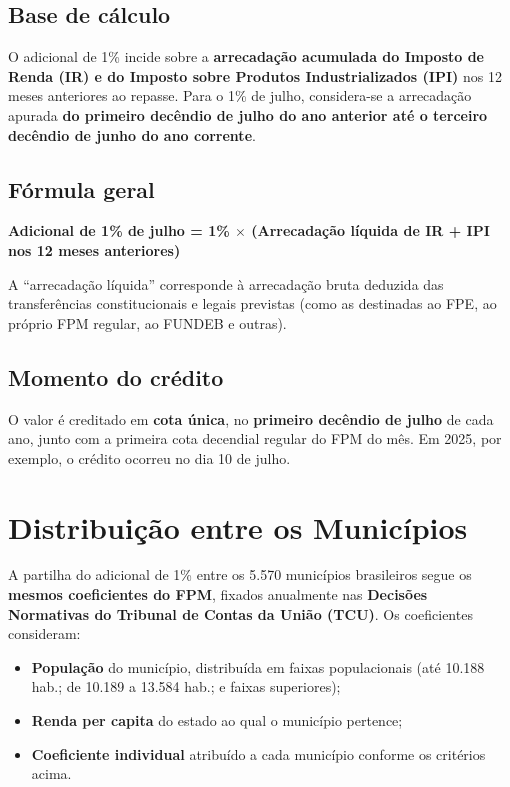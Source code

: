 \documentclass[12pt,a4paper]{article}
\begin{document}
\subsection{Base de cálculo}

O adicional de 1\% incide sobre a \textbf{arrecadação acumulada do Imposto de Renda (IR) e do Imposto sobre Produtos Industrializados (IPI)} nos 12 meses anteriores ao repasse. Para o 1\% de julho, considera-se a arrecadação apurada \textbf{do primeiro decêndio de julho do ano anterior até o terceiro decêndio de junho do ano corrente}.

\subsection{Fórmula geral}

\begin{center}
\textbf{Adicional de 1\% de julho = 1\% $\times$ (Arrecadação líquida de IR + IPI nos 12 meses anteriores)}
\end{center}

A ``arrecadação líquida'' corresponde à arrecadação bruta deduzida das transferências constitucionais e legais previstas (como as destinadas ao FPE, ao próprio FPM regular, ao FUNDEB e outras).

\subsection{Momento do crédito}

O valor é creditado em \textbf{cota única}, no \textbf{primeiro decêndio de julho} de cada ano, junto com a primeira cota decendial regular do FPM do mês. Em 2025, por exemplo, o crédito ocorreu no dia 10 de julho.

\section{Distribuição entre os Municípios}

A partilha do adicional de 1\% entre os 5.570 municípios brasileiros segue os \textbf{mesmos coeficientes do FPM}, fixados anualmente nas \textbf{Decisões Normativas do Tribunal de Contas da União (TCU)}. Os coeficientes consideram:

\begin{itemize}[leftmargin=2.5em]
  \item \textbf{População} do município, distribuída em faixas populacionais (até 10.188 hab.; de 10.189 a 13.584 hab.; e faixas superiores);
  \item \textbf{Renda per capita} do estado ao qual o município pertence;
  \item \textbf{Coeficiente individual} atribuído a cada município conforme os critérios acima.
\end{itemize}
\end{document}
